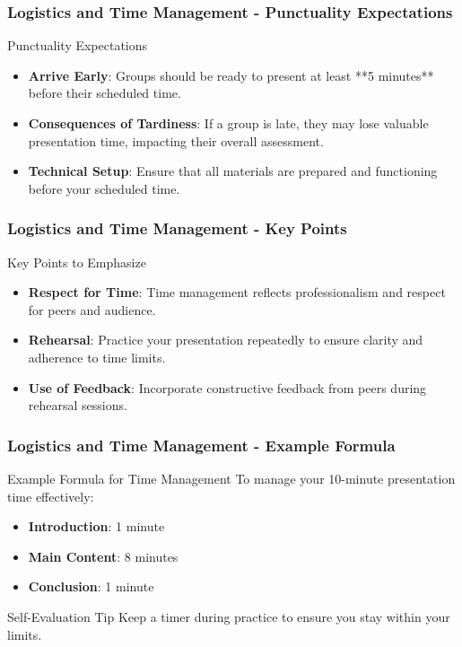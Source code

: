 \documentclass[aspectratio=169]{beamer}
\begin{document}
\begin{frame}[fragile]
    \frametitle{Logistics and Time Management - Punctuality Expectations}
    \begin{block}{Punctuality Expectations}
        \begin{itemize}
            \item \textbf{Arrive Early}: Groups should be ready to present at least **5 minutes** before their scheduled time.
            \item \textbf{Consequences of Tardiness}: If a group is late, they may lose valuable presentation time, impacting their overall assessment.
            \item \textbf{Technical Setup}: Ensure that all materials are prepared and functioning before your scheduled time.
        \end{itemize}
    \end{block}
\end{frame}

\begin{frame}[fragile]
    \frametitle{Logistics and Time Management - Key Points}
    \begin{block}{Key Points to Emphasize}
        \begin{itemize}
            \item \textbf{Respect for Time}: Time management reflects professionalism and respect for peers and audience.
            \item \textbf{Rehearsal}: Practice your presentation repeatedly to ensure clarity and adherence to time limits.
            \item \textbf{Use of Feedback}: Incorporate constructive feedback from peers during rehearsal sessions.
        \end{itemize}
    \end{block}
\end{frame}

\begin{frame}[fragile]
    \frametitle{Logistics and Time Management - Example Formula}
    \begin{block}{Example Formula for Time Management}
        To manage your 10-minute presentation time effectively:
        \begin{itemize}
            \item \textbf{Introduction}: 1 minute
            \item \textbf{Main Content}: 8 minutes
            \item \textbf{Conclusion}: 1 minute
        \end{itemize}
        \begin{block}{Self-Evaluation Tip}
            Keep a timer during practice to ensure you stay within your limits.
        \end{block}
    \end{block}
\end{frame}
\end{document}
